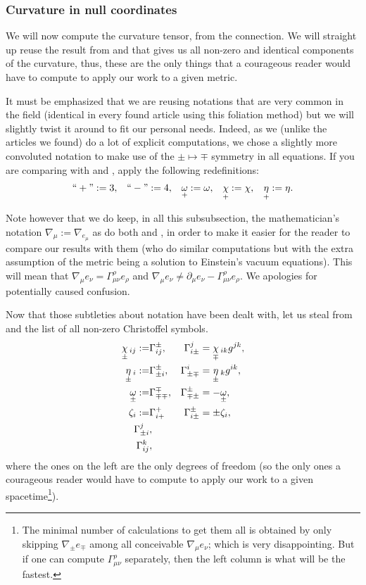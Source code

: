 \documentclass[a4paper,11pt]{article}
\numberwithin{equation}{section}
\theoremstyle{definition}
\begin{document}
\subsubsection{Curvature in null coordinates}
We will now compute the curvature tensor, from the connection. We will straight up reuse the result from \cite{Art} and \cite{Chris} that gives us all non-zero and identical components of the curvature, thus, these are the only things that a courageous reader would have to compute to apply our work to a given metric.

It must be emphasized that we are reusing notations that are very common in the field (identical in every found article using this foliation method) but we will slightly twist it around to fit our personal needs. Indeed, as we (unlike the articles we found) do a lot of explicit computations, we chose a slightly more convoluted notation to make use of the $\pm\mapsto\mp$ symmetry in all equations. If you are comparing with \cite{Art} and \cite{Chris}, apply the following redefinitions:
\begin{align}
    ``+":=3, && ``-":=4, && \underset{+}{\omega}:=\omega, && \underset{+}{\chi}:=\chi, && \underset{+}{\eta}:=\eta.
\end{align}

Note however that we do keep, in all this subsubsection, the mathematician's notation $\nabla_\mu:=\nabla_{e_\mu}$ as do both \cite{Art} and \cite{Chris}, in order to make it easier for the reader to compare our results with them (who do similar computations but with the extra assumption of the metric being a solution to Einstein's vacuum equations). This will mean that $\nabla_\mu e_\nu = \Gamma_{\mu\nu}^\rho e_\rho$ and $\nabla_\mu e_\nu \ne \partial_\mu e_\nu - \Gamma_{\mu\nu}^\rho e_\rho$. We apologies for potentially caused confusion.

Now that those subtleties about notation have been dealt with, let us steal from \cite{Art} and \cite{Chris} the list of all non-zero Christoffel symbols.
\begin{align}
    \underset{\pm}{\chi}\,_{ij} :=&\Gamma_{ij}^\pm, &\Gamma_{i\pm}^j&=\underset{\mp}{\chi}\,_{ik}g^{jk}\notag,\\
    \underset{\pm}{\eta}\,_i :=&\Gamma_{\pm i}^\pm, &\Gamma_{\pm\mp}^i&=\underset{\pm}{\eta}\,_kg^{ik}\notag,\\
    \underset{\pm}{\omega}:=&\Gamma_{\mp\mp}^\mp, &\Gamma_{\mp\pm}^\pm&=-\underset{\pm}{\omega}\label{Christoffel},\\
    \zeta_i :=& \Gamma_{i+}^+ &\Gamma_{i\pm}^\pm&=\pm\zeta_i \notag,\\
    \Gamma_{\pm i}^j&\notag,\\
    \Gamma_{ij}^k&\notag,
\end{align}
where the ones on the left are the only degrees of freedom (so the only ones a courageous reader would have to compute to apply our work to a given spacetime\footnote{The minimal number of calculations to get them all is obtained by only skipping $\nabla_\pm e_\mp$ among all conceivable $\nabla_\mu e_\nu$; which is very disappointing. But if one can compute $\Gamma_{\mu\nu}^\rho$ separately, then the left column is what will be the fastest.}).
\end{document}
